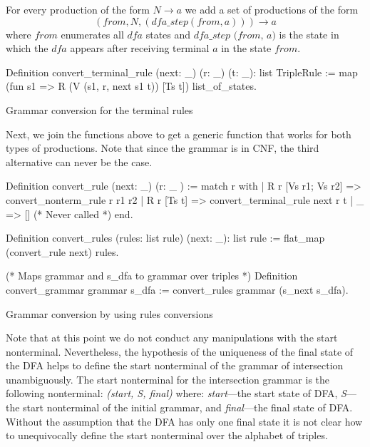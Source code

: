 For every production of the form $N \to a$ we add a set of productions of the form $$(\textit{from}, N, (\textit{dfa\_step}(\textit{from}, a))) \to a$$ where $\textit{from}$ enumerates all $\textit{dfa}$ states and $\textit{dfa\_step (from, a)}$ is the state in which the $\textit{dfa}$ appears after receiving terminal $a$ in the state $\textit{from}$.

\begin{listing}[h]
    \begin{pyglist}[language=coq, numbers=none, numbersep=5pt]
  Definition convert_terminal_rule 
              (next: _) 
              (r: _) 
              (t: _): list TripleRule :=
    map (fun s1 => R (V (s1, r, next s1 t)) 
	               [Ts t]) 
        list_of_states.
    \end{pyglist}
    \caption{Grammar conversion for the terminal rules}
    \label{lst:verbments1}
\end{listing}

Next, we join the functions above to get a generic function that works for both types of productions. 
Note that since the grammar is in CNF, the third alternative can never be the case.

\begin{listing}[h]
    \begin{pyglist}[language=coq, numbers=none, numbersep=5pt]
  Definition convert_rule (next: _) (r: _ ) :=
    match r with
    | R r [Vs r1; Vs r2] => 
        convert_nonterm_rule r r1 r2
    | R r [Ts t] => 
        convert_terminal_rule next r t 
    | _  => []   (* Never called *)
    end.
        
  Definition convert_rules 
    (rules: list rule) (next: _): list rule :=
    flat_map (convert_rule next) rules.
    
  (* Maps grammar and s_dfa 
     to grammar over triples *)
  Definition convert_grammar grammar s_dfa :=
    convert_rules grammar (s_next s_dfa). 
    \end{pyglist}
    \caption{Grammar conversion by using rules conversions}
    \label{lst:verbments1}
\end{listing}

Note that at this point we do not conduct any manipulations with the start nonterminal. Nevertheless, the hypothesis of the uniqueness of the final state of the DFA helps to define the start nonterminal of the grammar of intersection unambiguously. The start nonterminal for the intersection grammar is the following nonterminal: \textit{(start, S, final)} where: \textit{start}---the start state of DFA, \textit{S}---the start nonterminal of the initial grammar, and \textit{final}---the final state of DFA. Without the assumption that the DFA has only one final state it is not clear how to unequivocally define the start nonterminal over the alphabet of triples.

